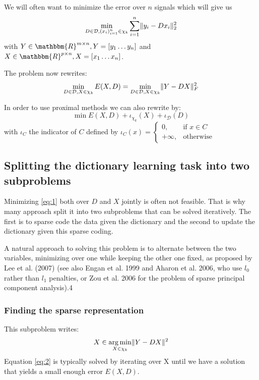 \documentclass[a4paper,11pt]{article}
\newcommand{\RR}{\mathbbm{R}} %
\DeclarePairedDelimiter\norm{\lVert}{\rVert} %
\DeclareMathOperator*{\argmin}{arg\,min} %
\begin{document}
We will often want to minimize the error over $n$ signals which will give us
$$\min\limits_{D \in \mathcal{D}, (x_i)_{i=1}^n \in \chi_k} \sum\limits_{i=1}^n \norm{y_i - Dx_i}_2^2$$
with $Y \in \RR^{m \times n}, Y = [y_1 \ldots y_n]$ and $X \in \RR^{p \times n}, X = [x_1 \ldots x_n]$.

The problem now rewrites:
\begin{equation} \label{eq:1}
\min\limits_{D \in \mathcal{D}, X \in \chi_k} E(X,D) = \min\limits_{D \in \mathcal{D}, X \in \chi_k} \norm{Y - DX}_F^2
\end{equation}

In order to use proximal methods we can also rewrite \label{eq:1} by:
$$\min E(X,D) + \iota_{\chi_k}(X) + \iota_{\mathcal{D}}(D)$$
with $\iota_C$ the indicator of $C$ defined by
$ \iota_C(x) =
\begin{cases}
0, & \text{if } x \in C\\
+ \infty, & \text{otherwise}
\end{cases}
$

\subsection{Splitting the dictionary learning task into two subproblems}
Minimizing \ref{eq:1} both over $D$ and $X$ jointly is often not feasible.
That is why many approach split it into two subproblems that can be solved iteratively.
The first is to sparse code the data given the dictionary and the second to update the dictionary given this sparse coding.

 A natural approach to solving
this problem is to alternate between the two variables, minimizing over one while keeping the other
one fixed, as proposed by Lee et al. (2007) (see also Engan et al. 1999 and Aharon et al. 2006, who
use $l_0$ rather than $l_1$ penalties, or Zou et al. 2006 for the problem of sparse principal component
analysis).4

\subsubsection{Finding the sparse representation}
This subproblem writes:
\begin{equation} \label{eq:2}
X \in \argmin_{X \in \chi_k} \norm{Y - DX}^2
\end{equation}
Equation \ref{eq:2} is typically solved by iterating over X until we have a solution that yields a small enough error $E(X,D)$.
\end{document}

